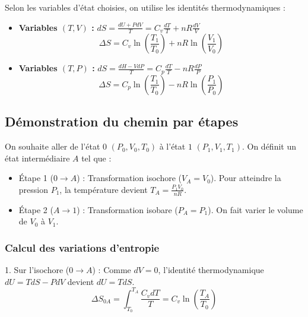 \documentclass[french]{yLectureNote}
\begin{document}
\begin{proposition}
    Selon les variables d'état choisies, on utilise les identités thermodynamiques :
    \begin{itemize}
        \item \textbf{Variables $(T, V)$ :} $dS = \frac{dU + P dV}{T} = C_v \frac{dT}{T} + nR \frac{dV}{V}$
        $$\Delta S = C_v \ln\left(\frac{T_1}{T_0}\right) + nR \ln\left(\frac{V_1}{V_0}\right)$$
        \item \textbf{Variables $(T, P)$ :} $dS = \frac{dH - V dP}{T} = C_p \frac{dT}{T} - nR \frac{dP}{P}$
        $$\Delta S = C_p \ln\left(\frac{T_1}{T_0}\right) - nR \ln\left(\frac{P_1}{P_0}\right)$$
    \end{itemize}
\end{proposition}



\subsection{Démonstration du chemin par étapes}

On souhaite aller de l'état $0$ $(P_0, V_0, T_0)$ à l'état $1$ $(P_1, V_1, T_1)$. On définit un état intermédiaire $A$ tel que :
\begin{itemize}
    \item Étape 1 ($0 \to A$) : Transformation isochore ($V_A = V_0$). Pour atteindre la pression $P_1$, la température devient $T_A = \frac{P_1 V_0}{nR}$.
    \item Étape 2 ($A \to 1$) : Transformation isobare ($P_A = P_1$). On fait varier le volume de $V_0$ à $V_1$.
\end{itemize}



\subsubsection{Calcul des variations d'entropie}

1. Sur l'isochore ($0 \to A$) :
   Comme $dV = 0$, l'identité thermodynamique $dU = TdS - PdV$ devient $dU = TdS$.
   $$\Delta S_{0A} = \int_{T_0}^{T_A} \frac{C_v dT}{T} = C_v \ln\left(\frac{T_A}{T_0}\right)$$
\end{document}
